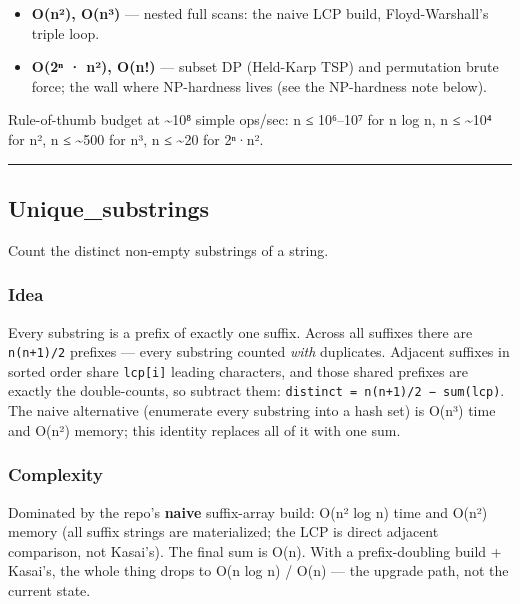 \documentclass[
  10pt,
  letterpaper,
  onecolumn]{article}
\providecommand{\tightlist}{%
  \setlength{\itemsep}{0pt}\setlength{\parskip}{0pt}}
\begin{document}
\begin{itemize}
\tightlist
\item
  \textbf{O(n²), O(n³)} --- nested full scans: the naive LCP build,
  Floyd-Warshall's triple loop.
\item
  \textbf{O(2ⁿ · n²), O(n!)} --- subset DP (Held-Karp TSP) and
  permutation brute force; the wall where NP-hardness lives (see the
  NP-hardness note below).
\end{itemize}

Rule-of-thumb budget at \textasciitilde10⁸ simple ops/sec: n ≤ 10⁶--10⁷
for n log n, n ≤ \textasciitilde10⁴ for n², n ≤ \textasciitilde500 for
n³, n ≤ \textasciitilde20 for 2ⁿ·n².

\begin{center}\rule{0.5\linewidth}{0.5pt}\end{center}

\hypertarget{unique_substrings}{%
\subsection{Unique\_substrings}\label{unique_substrings}}

Count the distinct non-empty substrings of a string.

\hypertarget{idea}{%
\subsubsection{Idea}\label{idea}}

Every substring is a prefix of exactly one suffix. Across all suffixes
there are \texttt{n(n+1)/2} prefixes --- every substring counted
\emph{with} duplicates. Adjacent suffixes in sorted order share
\texttt{lcp{[}i{]}} leading characters, and those shared prefixes are
exactly the double-counts, so subtract them:
\texttt{distinct\ =\ n(n+1)/2\ −\ sum(lcp)}. The naive alternative
(enumerate every substring into a hash set) is O(n³) time and O(n²)
memory; this identity replaces all of it with one sum.

\hypertarget{complexity}{%
\subsubsection{Complexity}\label{complexity}}

Dominated by the repo's \textbf{naive} suffix-array build: O(n² log n)
time and O(n²) memory (all suffix strings are materialized; the LCP is
direct adjacent comparison, not Kasai's). The final sum is O(n). With a
prefix-doubling build + Kasai's, the whole thing drops to O(n log n) /
O(n) --- the upgrade path, not the current state.
\end{document}

